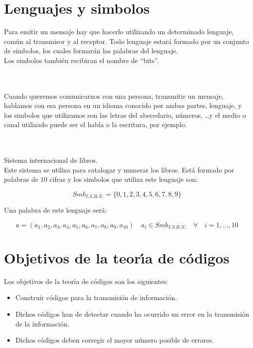 %
%

\section{Lenguajes y simbolos}

Para emitir un mensaje hay que hacerlo utilizando un determinado lenguaje,
com\'un al transmisor y al receptor. Todo lenguaje estar\'a formado por un
conjunto de simbolos, los cuales formar\'an las palabras del lenguaje.\\

Los simbolos tambi\'en recibiran el nombre de ``bits''.

\begin{ejemplo}
\ \\ \\
Cuando queremos comunicarnos con una persona, transmitir un mensaje, hablamos
con esa persona en un idioma conocido por ambas partes, lenguaje, y los
simbolos que utilizamos son las letras del abecedario, n\'umeros, \dots y el
medio o canal utilizado puede ser el habla o la escritura, por ejemplo.
\end{ejemplo} 

\begin{ejemplo}[I.S.B.N.]
\ \\ \\
Sistema internacional de libros. \\

Este sistema se utiliza para catalogar y numerar los libros. Est\'a formado por
palabras de $10$ cifras y los simbolos que utiliza este lenguaje son:

\begin{displaymath}
Smb_{I.S.B.N.} = \{0, 1, 2, 3, 4, 5, 6, 7, 8, 9 \}
\end{displaymath}

Una palabra de este lenguaje ser\'a:

\begin{displaymath}
a=(a_1,a_2,a_3,a_4,a_5,a_6,a_7,a_8,a_9,a_{10})\quad a_i \in Smb_{I.S.B.N.}
\quad \forall \quad i=1,\ldots,10
\end{displaymath}
\end{ejemplo}
%
\newpage
%
\section{Objetivos de la teor\'{\i}a de c\'odigos}

Los objetivos de la teor\'{\i}a de c\'odigos son los siguientes:
\begin{itemize}
\item Construir c\'odigos para la transmisi\'on de informaci\'on.
\item Dichos c\'odigos han de detectar cuando ha ocurrido un error en la
transmisi\'on de la informaci\'on.
\item Dichos c\'odigos deben corregir el mayor n\'umero posible de errores.
\end{itemize}

